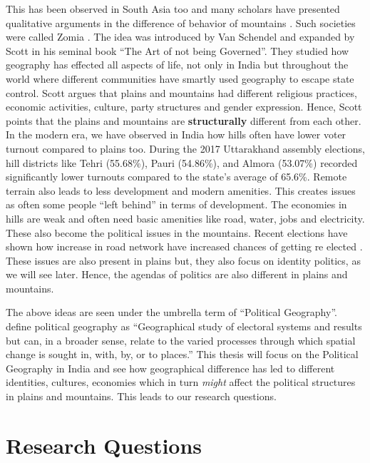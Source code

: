 \begin{sloppypar}
This has been observed in South Asia too and many scholars have presented qualitative arguments in the difference of behavior of mountains \citep{ali2019delusional,murton2013himalayan,alam2008becoming,hussain2015remoteness}. Such societies were called Zomia \citep{van2005geographies}. The idea was introduced by Van Schendel and expanded by Scott in his seminal book ``The Art of not being Governed''. They studied how geography has effected all aspects of life, not only in India but throughout the world where different communities have smartly used geography to escape state control. Scott argues that plains and mountains had different religious practices, economic activities, culture, party structures and gender expression. Hence, Scott points that the plains and mountains are \textbf{structurally} different from each other.  In the modern era, we have observed in India how hills often have lower voter turnout compared to plains too. During the 2017 Uttarakhand assembly elections, hill districts like Tehri (55.68\%), Pauri (54.86\%), and Almora (53.07\%) recorded significantly lower turnouts compared to the state's average of 65.6\%. Remote terrain also leads to less development and modern amenities. This creates issues as often some people ``left behind'' in terms of development. The economies in hills are weak and often need basic amenities like road, water, jobs and electricity. These also become the political issues in the mountains. Recent elections have shown how increase in road network have increased chances of getting re elected \citep{basistha2024elections}. These issues are also present in plains but, they also focus on identity politics, as we will see later. Hence, the agendas of politics are also different in plains and mountains.

\vspace{0.3cm}

The above ideas are seen under the umbrella term of ``Political Geography''. \cite{kitchin2009international} define political geography as ``Geographical study of electoral systems and results but can, in a broader sense, relate to the varied processes through which spatial change is sought in, with, by, or to places.'' This thesis will focus on the Political Geography in India and see how geographical difference has led to different identities, cultures, economies which in turn \textit{might} affect the political structures in plains and mountains. This leads to our research questions.

\section{Research Questions}


\end{sloppypar}

